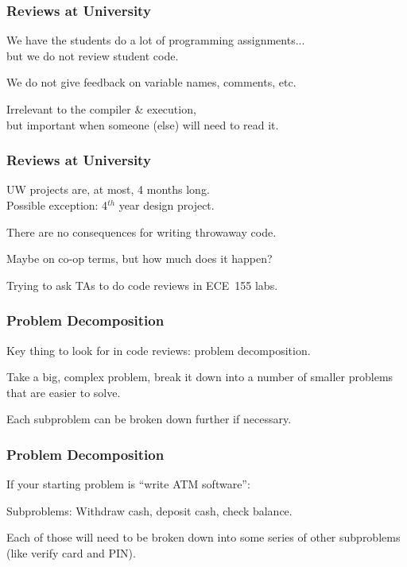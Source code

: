\begin{frame}
\frametitle{Reviews at University}

\begin{changemargin}{1cm}
We have the students do a lot of programming assignments...\\
\quad but we do not review student code.

We do not give feedback on variable names, comments, etc.

Irrelevant to the compiler \& execution,\\
\quad but important when someone (else) will need to read it.

\end{changemargin}
\end{frame}

\begin{frame}
\frametitle{Reviews at University}

\begin{changemargin}{1cm}
UW projects are, at most, 4 months long.\\
\quad Possible exception: 4$^{th}$ year design project.

There are no consequences for writing throwaway code.

Maybe on co-op terms, but how much does it happen?

Trying to ask TAs to do code reviews in ECE~155 labs.

\end{changemargin}
\end{frame}

\begin{frame}
\frametitle{Problem Decomposition}

\begin{changemargin}{1cm}
Key thing to look for in code reviews: problem decomposition.

Take a big, complex problem, break it down into a number of smaller problems that are easier to solve. 

Each subproblem can be broken down further if necessary.

\end{changemargin}
\end{frame}

\begin{frame}
\frametitle{Problem Decomposition}

\begin{changemargin}{1cm}

If your starting problem is ``write ATM software'':

Subproblems: Withdraw cash, deposit cash, check balance. 

Each of those will need to be broken down into some series of other subproblems (like verify card and PIN). 

\end{changemargin}
\end{frame}

